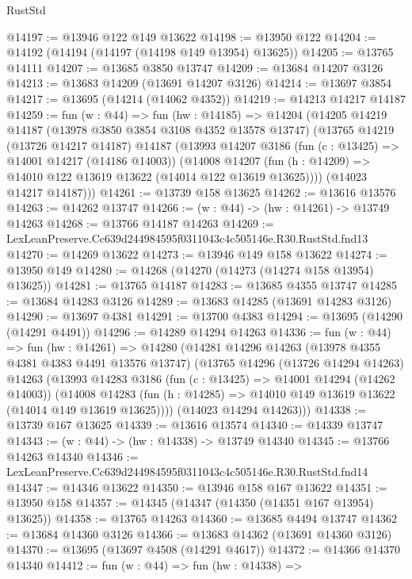 \begin{lexlean}{RustStd}
\begin{coremodule}
@14197 := @13946 @122 @149 @13622
@14198 := @13950 @122
@14204 := @14192 (@14194 (@14197 (@14198 @149 @13954) @13625))
@14205 := @13765 @14111
@14207 := @13685 @3850 @13747
@14209 := @13684 @14207 @3126
@14213 := @13683 @14209 (@13691 @14207 @3126)
@14214 := @13697 @3854
@14217 := @13695 (@14214 (@14062 @4352))
@14219 := @14213 @14217 @14187
@14259 := fun (w : @44) =>
  fun (hw : @14185) =>
  @14204
    (@14205
      @14219
      @14187
      (@13978 @3850 @3854 @3108 @4352 @13578 @13747)
      (@13765
        @14219
        (@13726 @14217 @14187)
        @14187
        (@13993
          @14207
          @3186
          (fun (c : @13425) => @14001 @14217 (@14186 @14003))
          (@14008
            @14207
            (fun (h : @14209) => @14010 @122 @13619 @13622 (@14014 @122 @13619 @13625))))
        (@14023 @14217 @14187)))
@14261 := @13739 @158 @13625
@14262 := @13616 @13576
@14263 := @14262 @13747
@14266 := (w : @44) -> (hw : @14261) -> @13749 @14263
@14268 := @13766 @14187 @14263
@14269 := LexLeanPreserve.Cc639d244984595f0311043c4c505146e.R30.RustStd.fnd13
@14270 := @14269 @13622
@14273 := @13946 @149 @158 @13622
@14274 := @13950 @149
@14280 := @14268 (@14270 (@14273 (@14274 @158 @13954) @13625))
@14281 := @13765 @14187
@14283 := @13685 @4355 @13747
@14285 := @13684 @14283 @3126
@14289 := @13683 @14285 (@13691 @14283 @3126)
@14290 := @13697 @4381
@14291 := @13700 @4383
@14294 := @13695 (@14290 (@14291 @4491))
@14296 := @14289 @14294 @14263
@14336 := fun (w : @44) =>
  fun (hw : @14261) =>
  @14280
    (@14281
      @14296
      @14263
      (@13978 @4355 @4381 @4383 @4491 @13576 @13747)
      (@13765
        @14296
        (@13726 @14294 @14263)
        @14263
        (@13993
          @14283
          @3186
          (fun (c : @13425) => @14001 @14294 (@14262 @14003))
          (@14008
            @14283
            (fun (h : @14285) => @14010 @149 @13619 @13622 (@14014 @149 @13619 @13625))))
        (@14023 @14294 @14263)))
@14338 := @13739 @167 @13625
@14339 := @13616 @13574
@14340 := @14339 @13747
@14343 := (w : @44) -> (hw : @14338) -> @13749 @14340
@14345 := @13766 @14263 @14340
@14346 := LexLeanPreserve.Cc639d244984595f0311043c4c505146e.R30.RustStd.fnd14
@14347 := @14346 @13622
@14350 := @13946 @158 @167 @13622
@14351 := @13950 @158
@14357 := @14345 (@14347 (@14350 (@14351 @167 @13954) @13625))
@14358 := @13765 @14263
@14360 := @13685 @4494 @13747
@14362 := @13684 @14360 @3126
@14366 := @13683 @14362 (@13691 @14360 @3126)
@14370 := @13695 (@13697 @4508 (@14291 @4617))
@14372 := @14366 @14370 @14340
@14412 := fun (w : @44) =>
  fun (hw : @14338) =>

\end{coremodule}
\end{lexlean}
